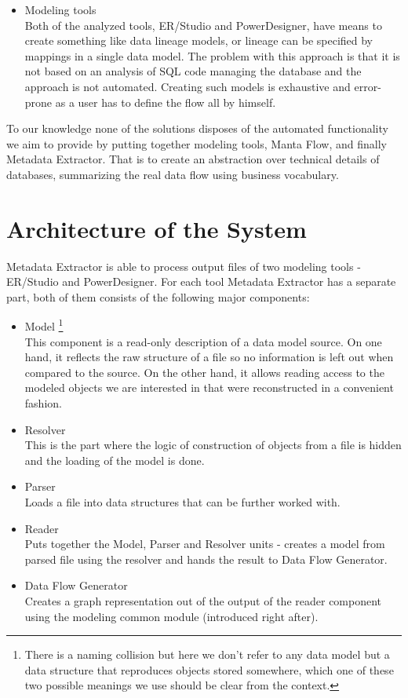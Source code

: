 \begin{itemize}
	\item Modeling tools \\
	Both of the analyzed tools, ER/Studio and PowerDesigner, have means to create something like data lineage models, or lineage can be specified by mappings in a single data model. The problem with this approach is that it is not based on an analysis of SQL code managing the database and the approach is not automated. Creating such models is exhaustive and error-prone as a user has to define the flow all by himself. 
\end{itemize}


To our knowledge none of the solutions disposes of the automated functionality we aim to provide by putting together modeling tools, Manta Flow, and finally Metadata Extractor. That is to create an abstraction over technical details of databases, summarizing the real data flow using business vocabulary.

\section{Architecture of the System}

Metadata Extractor is able to process output files of two modeling tools - ER/Studio and PowerDesigner. For each tool Metadata Extractor has a separate part, both of them consists of the following major components:
\begin{itemize}
	\item Model \footnote{There is a naming collision but here we don't refer to any data model but a data structure that reproduces objects stored somewhere, which one of these two possible meanings we use should be clear from the context.}\\ 
	This component is a read-only description of a data model source. On one hand, it reflects the raw structure of a file so no information is left out when compared to the source. 
	On the other hand, it allows reading access to the modeled objects we are interested in that were reconstructed in a convenient fashion.
	\item Resolver \\ 
	This is the part where the logic of construction of objects from a file is hidden and the loading of the model is done. 
	\item Parser \\ 
	Loads a file into data structures that can be further worked with.
	\item Reader \\
	Puts together the Model, Parser and Resolver units - creates a model from parsed file using the resolver and hands the result to Data Flow Generator.
	\item Data Flow Generator \\ 
	Creates a graph representation out of the output of the reader component using the modeling common module (introduced right after).
\end{itemize}

